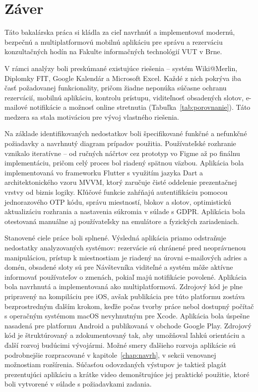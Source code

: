 \chapter{Záver}\label{chap:zaver}
Táto bakalárska práca si kládla za cieľ navrhnúť a implementovať modernú, bezpečnú a multiplatformovú mobilnú aplikáciu  pre správu a rezerváciu konzultačných hodín na Fakulte informačných technológií VUT v Brne.

V rámci analýzy boli preskúmané existujúce riešenia – systém Wiki@Merlin, Diplomky FIT, Google Kalendár a Microsoft Excel. Každé z nich pokrýva iba časť požadovanej funkcionality, pričom žiadne neponúka súčasne ochranu rezervácií, mobilnú aplikáciu, kontrolu prístupu, viditeľnosť obsadených slotov, e-mailové notifikácie a možnosť online stretnutia (Tabuľka~\ref{tab:porovnanie}). Táto medzera sa stala motiváciou pre vývoj vlastného riešenia.

Na základe identifikovaných nedostatkov boli špecifikované funkčné a nefunkčné požiadavky a navrhnutý diagram prípadov použitia. Používateľské rozhranie vznikalo iteratívne – od ručných náčrtov cez prototyp vo Figme až po finálnu implementáciu, pričom celý proces bol riadený spätnou väzbou. Aplikácia bola implementovaná vo frameworku Flutter s využitím jazyka Dart a architektonického vzoru MVVM, ktorý zaručuje čisté oddelenie prezentačnej vrstvy od biznis logiky. Kľúčové funkcie zahŕňajú autentifikáciu pomocou jednorazového OTP kódu, správu miestností, blokov a slotov, optimistickú aktualizáciu roz\-hrania a nastavenia súkromia v súlade s GDPR. Aplikácia bola otestovaná manuálne aj používateľsky na emulátore a fyzických zariadeniach.

Stanovené ciele práce boli splnené. Výsledná aplikácia priamo odstraňuje nedostatky analyzovaných systémov: rezervácie sú chránené pred neoprávnenou manipuláciou, prístup k miestnostiam je riadený na úrovni e-mailových adries a domén, obsadené sloty sú pre Návštevníka viditeľné a systém môže aktívne informovať používateľov o zmenách, pokiaľ majú notifikácie povolené. Aplikácia bola navrhnutá a implementovaná ako multiplatformová. Zdrojový kód je plne pripravený na kompiláciu pre iOS, avšak publikácia pre túto platformu zostáva bezprostredným ďalším krokom, keďže počas tvorby práce nebol dostupný počítač s operačným systémom macOS nevyhnutným pre Xcode. Aplikácia bola úspešne nasadená pre platformu Android a publikovaná v obchode Google Play. Zdrojový kód je štruktúrovaný a zdokumentovaný tak, aby umožňoval ľahkú orientáciu a ďalší rozvoj budúcimi vývojármi. Možné smery ďalšieho rozvoja aplikácie sú podrobnejšie rozpracované v kapitole~\ref{chap:navrh}, v sekcii venovanej možnostiam rozšírenia. Súčasťou odovzdaných výstupov je taktiež plagát 
prezentujúci aplikáciu a krátke video demonštrujúce 
jej praktické použitie, ktoré boli vytvorené 
v súlade s požiadavkami zadania.